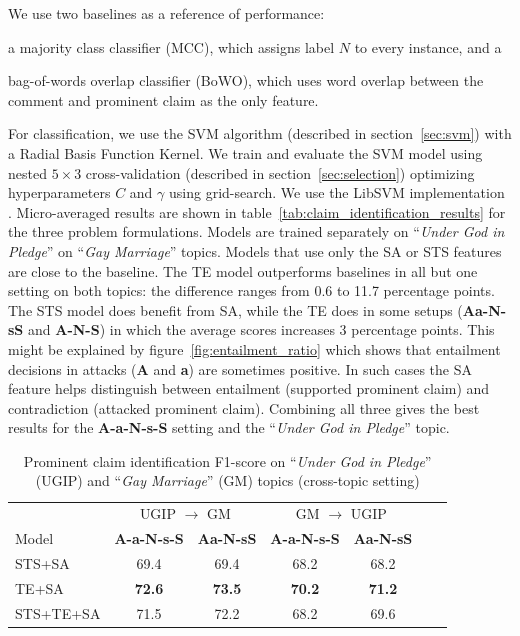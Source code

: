 We use two baselines as a reference of performance: \begin{enumerate*}
\item a majority class classifier (MCC), which assigns label $N$ to every instance, and a 
\item bag-of-words overlap classifier (BoWO), which uses word overlap between
	the comment and prominent claim as the only feature.
\end{enumerate*}
For classification, we use the SVM algorithm (described in section~\ref{sec:svm}) with a 
Radial Basis Function Kernel. 
We train and evaluate the SVM model using nested $5 \times 3$ cross-validation
(described in section~\ref{sec:selection}) optimizing hyperparameters $C$ and $\gamma$ using
grid-search. 
We use the LibSVM implementation \citep{chang2011libsvm}. 
Micro-averaged results are shown in table~\ref{tab:claim_identification_results}
for the three problem formulations. 
Models are trained separately on ``\emph{Under God in Pledge}'' on ``\emph{Gay
Marriage}'' topics. 
Models that use only the SA or STS features are close to the baseline. 
The TE model outperforms baselines in all but one setting on both topics: 
the difference ranges from 0.6 to 11.7 percentage points. 
The STS model does benefit from SA, while the TE does in some setups 
(\textbf{Aa-N-sS} and \textbf{A-N-S}) in which the average scores increases 3 percentage points. 
This might be explained by figure~\ref{fig:entailment_ratio} which shows that 
entailment decisions in attacks (\textbf{A} and \textbf{a}) are sometimes positive. 
In such cases the SA feature helps distinguish between entailment (supported prominent claim) 
and contradiction (attacked prominent claim). 
Combining all three gives the best results for the \textbf{A-a-N-s-S} setting
and the ``\emph{Under God in Pledge}'' topic.

\begin{table}
\centering
{\small
\begin{tabular}{@{}l ccc ccc@{}}
\toprule
& \multicolumn{2}{c}{UGIP $\to$ GM} & \multicolumn{2}{c}{GM $\to$ UGIP}\\
\cmidrule(lr){2-3}\cmidrule(lr){4-5}
Model & \textbf{A-a-N-s-S} & \textbf{Aa-N-sS}
      & \textbf{A-a-N-s-S} & \textbf{Aa-N-sS} \\
\midrule
STS+SA & 69.4 & 69.4 & 68.2 & 68.2   \\
TE+SA & \textbf{72.6 }& \textbf{73.5} & \textbf{70.2} & \textbf{71.2}  \\
STS+TE+SA  & 71.5 & 72.2 & 68.2 & 69.6  \\
\bottomrule
\end{tabular}}
	\caption{Prominent claim identification F1-score on ``\emph{Under God
	in Pledge}'' (UGIP) and ``\emph{Gay Marriage}'' (GM) topics (cross-topic
setting)}
\label{tab:claim_identification_crosstopic}
\end{table}


